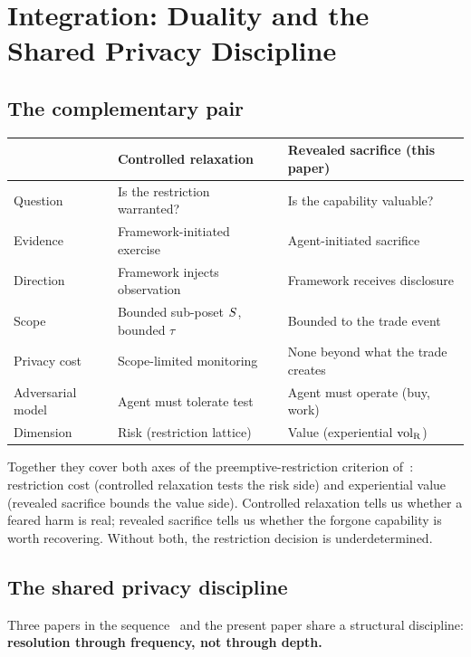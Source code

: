 \section{Integration: Duality and the Shared Privacy Discipline}
\label{sec:integration}

\subsection{The complementary pair}

\begin{center}
\small
\begin{tabular}{@{}lll@{}}
\toprule
& \textbf{Controlled relaxation}~\citep{lasser2026wamura}
& \textbf{Revealed sacrifice} (this paper) \\
\midrule
Question & Is the restriction warranted?
& Is the capability valuable? \\
Evidence & Framework-initiated exercise
& Agent-initiated sacrifice \\
Direction & Framework injects observation
& Framework receives disclosure \\
Scope & Bounded sub-poset $S$, bounded $\tau$
& Bounded to the trade event \\
Privacy cost & Scope-limited monitoring
& None beyond what the trade creates \\
Adversarial model & Agent must tolerate test
& Agent must operate (buy, work) \\
Dimension & Risk (restriction lattice)
& Value (experiential ${\operatorname{vol}_{\mathrm{R}}}$) \\
\bottomrule
\end{tabular}
\end{center}

Together they cover both axes of the preemptive-restriction
criterion of~\citep[Proposition~1]{lasser2026horizon}: restriction
cost (controlled relaxation tests the risk side) and experiential
value (revealed sacrifice bounds the value side).  Controlled
relaxation tells us whether a feared harm is real; revealed
sacrifice tells us whether the forgone capability is worth
recovering.  Without both, the restriction decision is
underdetermined.

\subsection{The shared privacy discipline}

Three papers in the
sequence~\citep{lasser2026phase,lasser2026wamura} and the present
paper share a structural discipline: \textbf{resolution through
frequency, not through depth.}

